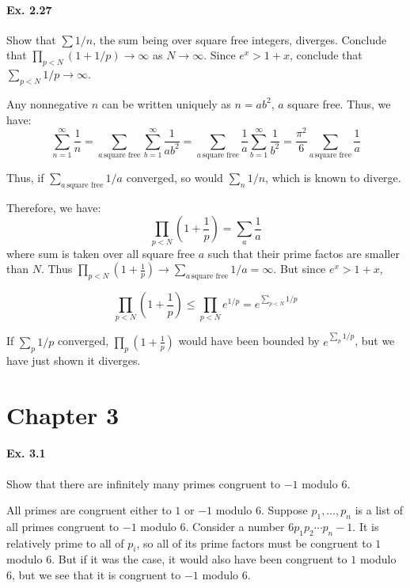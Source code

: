 \documentclass[notitlepage]{article}
\theoremstyle{definition}
\begin{document}
\paragraph{Ex. 2.27}
Show that $\sum 1/n$, the sum being over square free integers,
diverges. Conclude that $\prod_{p < N} (1+1/p) \to \infty$ as $N \to
\infty$. Since $e^x > 1 + x$, conclude that $\sum_{p < N} 1/p \to
\infty$.

Any nonnegative $n$ can be written uniquely as $n = a b^2$, $a$ square free. Thus, we have:
\begin{equation}
  \sum_{n = 1}^\infty \frac{1}{n} = \sum_{a \, \textrm{square free}}
  \sum_{b = 1}^\infty \frac{1}{ab^2} = \sum_{a \, \textrm{square
      free}} \frac{1}{a} \sum_{b = 1}^\infty \frac{1}{b^2} = \frac{\pi^2}{6}\sum_{a \, \textrm{square free}} \frac{1}{a}
\end{equation}

Thus, if $\sum_{a \, \textrm{square free}} 1/a$ converged, so would
$\sum_n 1/n$, which is known to diverge.

Therefore, we have:
\begin{equation}
  \prod_{p < N}(1+\frac{1}{p}) = \sum_a \frac{1}{a}
\end{equation}
where sum is taken over all square free $a$ such that their prime
factos are smaller than $N$. Thus $\prod_{p < N}(1+\frac{1}{p}) \to
\sum_{a \, \textrm{square free}} 1/a = \infty$. But since $e^x > 1 + x$,

\begin{equation}
  \prod_{p < N}(1+\frac{1}{p}) \leq \prod_{p<N} e^{1/p} = e^{\sum_{p<N} 1/p}
\end{equation}

If $\sum_p 1/p$ converged, $\prod_p (1+\frac{1}{p})$ would
have been bounded by $e^{\sum_{p} 1/p}$, but we have just shown it
diverges.

\section{Chapter 3}

\paragraph{Ex. 3.1}
Show that there are infinitely many primes congruent to $-1$ modulo $6$.

All primes are congruent either to $1$ or $-1$ modulo $6$. Suppose
$p_1, \ldots, p_n$ is a list of all primes congruent to $-1$ modulo
$6$. Consider a number $6p_1 p_2 \cdots p_n - 1$. It is relatively
prime to all of $p_i$, so all of its prime factors must be congruent
to $1$ modulo $6$. But if it was the case, it would also have been
congruent to $1$ modulo $6$, but we see that it is congruent to $-1$
modulo 6.
\end{document}
